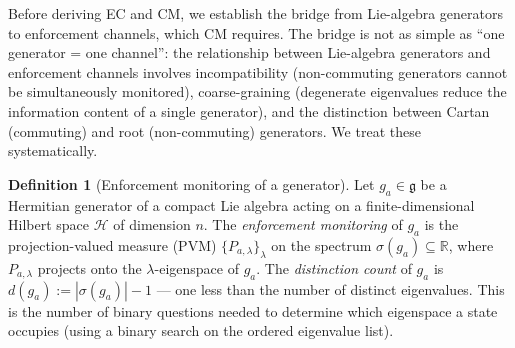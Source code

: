 \documentclass[11pt,a4paper]{article}
\theoremstyle{definition}
\newtheorem{definition}[theorem]{Definition}
\begin{document}
Before deriving EC and CM, we establish the bridge from
Lie-algebra generators to enforcement channels, which CM requires.
The bridge is not as simple as ``one generator = one channel'': the
relationship between Lie-algebra generators and enforcement channels
involves incompatibility (non-commuting generators cannot be
simultaneously monitored), coarse-graining (degenerate eigenvalues
reduce the information content of a single generator), and the
distinction between Cartan (commuting) and root (non-commuting)
generators.  We treat these systematically.

\begin{definition}[Enforcement monitoring of a generator]%
\label{def:monitoring}
Let $g_a \in \mathfrak{g}$ be a Hermitian generator of a compact Lie
algebra acting on a finite-dimensional Hilbert space $\mathcal{H}$ of
dimension $n$.  The \emph{enforcement monitoring} of $g_a$ is the
projection-valued measure (PVM) $\{P_{a,\lambda}\}_\lambda$ on the
spectrum $\sigma(g_a) \subseteq \mathbb{R}$, where $P_{a,\lambda}$
projects onto the $\lambda$-eigenspace of $g_a$.  The \emph{distinction
count} of $g_a$ is $d(g_a) := |\sigma(g_a)| - 1$ --- one less than
the number of distinct eigenvalues.  This is the number of binary
questions needed to determine which eigenspace a state occupies
(using a binary search on the ordered eigenvalue list).
\end{definition}
\end{document}
